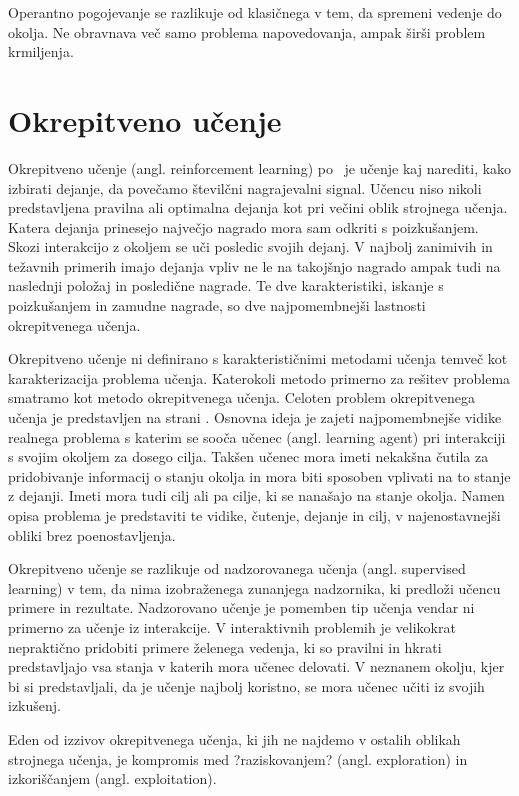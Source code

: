 \documentclass[a4paper, oneside, 12pt]{report}
\begin{document}
Operantno pogojevanje se razlikuje od klasičnega v tem, da spremeni vedenje do okolja. Ne obravnava več samo problema napovedovanja, ampak širši problem krmiljenja.

\section{Okrepitveno učenje} %
Okrepitveno učenje (angl. reinforcement learning) po~\cite{ReinforcementLearningAnIntroduction} je učenje kaj narediti, kako izbirati dejanje, da povečamo številčni nagrajevalni signal. Učencu niso nikoli predstavljena pravilna ali optimalna dejanja kot pri večini oblik strojnega učenja. Katera dejanja prinesejo največjo nagrado mora sam odkriti s poizkušanjem. Skozi interakcijo z okoljem se uči posledic svojih dejanj. V najbolj zanimivih in težavnih primerih imajo dejanja vpliv ne le na takojšnjo nagrado ampak tudi na naslednji položaj in posledične nagrade. Te dve karakteristiki, iskanje s poizkušanjem in zamudne nagrade, so dve najpomembnejši lastnosti okrepitvenega učenja.

Okrepitveno učenje ni definirano s karakterističnimi metodami učenja temveč kot karakterizacija problema učenja. Katerokoli metodo primerno za rešitev problema smatramo kot metodo okrepitvenega učenja. Celoten problem okrepitvenega učenja je predstavljen na strani \pageref{chapter:Problem}. Osnovna ideja je zajeti najpomembnejše vidike realnega problema s katerim se sooča učenec (angl. learning agent) pri interakciji s svojim okoljem za dosego cilja. Takšen učenec mora imeti nekakšna čutila za pridobivanje informacij o stanju okolja in mora biti sposoben vplivati na to stanje z dejanji. Imeti mora tudi cilj ali pa cilje, ki se nanašajo na stanje okolja. Namen opisa problema je predstaviti te vidike, čutenje, dejanje in cilj, v najenostavnejši obliki brez poenostavljenja.

Okrepitveno učenje se razlikuje od nadzorovanega učenja (angl. supervised learning) v tem, da nima izobraženega zunanjega nadzornika, ki predloži učencu primere in rezultate. Nadzorovano učenje je pomemben tip učenja vendar ni primerno za učenje iz interakcije. V interaktivnih problemih je velikokrat nepraktično pridobiti primere želenega vedenja, ki so pravilni in hkrati predstavljajo vsa stanja v katerih mora učenec delovati. V neznanem okolju, kjer bi si predstavljali, da je učenje najbolj koristno, se mora učenec učiti iz svojih izkušenj.

Eden od izzivov okrepitvenega učenja, ki jih ne najdemo v ostalih oblikah strojnega učenja, je kompromis med ?raziskovanjem? (angl. exploration) in izkoriščanjem (angl. exploitation). 
\end{document}
